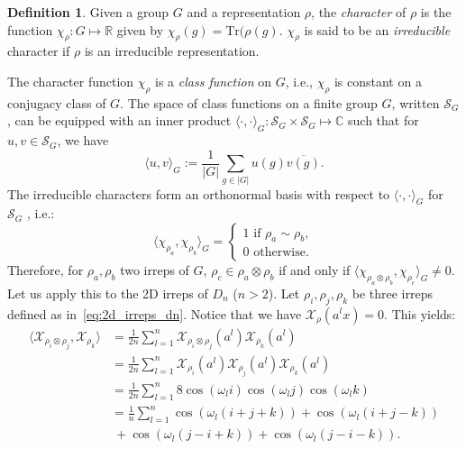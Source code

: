 \documentclass{article}
\theoremstyle{plain}
\theoremstyle{definition}
\newtheorem{definition}[theorem]{Definition}
\theoremstyle{remark}
\begin{document}
\begin{definition}{\cite{steinberg2011representation}}
    Given a group $G$ and a representation $\rho$, the \emph{character} of $\rho$ is the function $\chi_\rho:G\mapsto\mathbb{R}$ given by $\chi_\rho(g) = \mathrm{Tr}(\rho(g)$. $\chi_\rho$ is said to be an \emph{irreducible} character if $\rho$ is an irreducible representation.
\end{definition}
The character function $\chi_\rho$ is a \emph{class function} on $G$, i.e., $\chi_\rho$ is constant on a conjugacy class of $G$. The space of class functions on a finite group $G$, written $\mathcal{S}_G$, can be equipped with an inner product $\langle\cdot,\cdot\rangle_G:\mathcal{S}_G\times \mathcal{S}_G\mapsto \mathbb{C}$ such that for $u,v\in \mathcal{S}_G$, we have
\begin{equation}
    \langle u, v\rangle_G:=\frac{1}{|G|}\sum_{g\in|G|}u(g)\overline{v(g)}.
\end{equation}
The irreducible characters form an orthonormal basis with respect to $\langle\cdot,\cdot\rangle_G$ for $\mathcal{S}_G$ \cite{steinberg2011representation}, i.e.:
\begin{equation}
    \langle \chi_{\rho_a},\chi_{\rho_b}\rangle_G=\begin{cases}
        1\text{ if } \rho_a\sim \rho_b,\\
        0 \text{ otherwise.}
    \end{cases}
\end{equation}
Therefore, for $\rho_a, \rho_b$ two irreps of $G$, $\rho_c\in\rho_a\otimes\rho_b$ if and only if $ \langle \chi_{\rho_a\otimes \rho_b},\chi_{\rho_c}\rangle_G\neq 0$. Let us apply this to the 2D irreps of $D_n$ ($n>2$). Let $\rho_i,\rho_j,\rho_k$ be three irreps defined as in~\eqref{eq:2d_irreps_dn}.
Notice that we have $\mathcal{X}_{\rho}(a^lx)=0$. This yields:
\begin{align*}
    \langle \mathcal{X}_{\rho_i\otimes\rho_j},\mathcal{X}_{\rho_k}\rangle &=\frac{1}{2n}\sum_{l=1}^n \mathcal{X}_{\rho_i\otimes\rho_j}(a^l)\mathcal{X}_{\rho_k}(a^l)\\
    &=\frac{1}{2n}\sum_{l=1}^n \mathcal{X}_{\rho_i}(a^l)\mathcal{X}_{\rho_j}(a^l)\mathcal{X}_{\rho_k}(a^l)\\
    &=\frac{1}{2n}\sum_{l=1}^n 8\cos(\omega_l i)\cos(\omega_l j)\cos(\omega_l k)\\
    &=\frac{1}{n}\sum_{l=1}^n \cos(\omega_l (i+j+k))+\cos(\omega_l (i+j-k))\\ &\ +\cos(\omega_l (j-i+k))+\cos(\omega_l (j-i-k)).
\end{align*}
\end{document}
